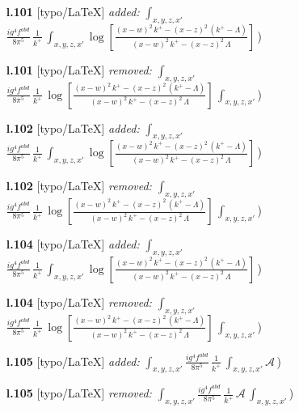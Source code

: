 \documentclass[10pt]{article}
\begin{document}
\begin{itemize}[leftmargin=2.2em,itemsep=1pt,topsep=2pt]
\item[\textbf{l.101}] \textsf{\small [typo/LaTeX]} \emph{added:} $\displaystyle \int_{x,y,z,x'}$$\displaystyle \frac{ig^{4}f^{abd}}{8\pi^{5}}\,\frac{1}{k^{+}}\,\int_{x,y,z,x'}\log{[\frac{(x-w)^{2}\,k^{+}-(x-z)^{2}\,(k^{+}-\Lambda)}{(x-w)^{2}\,k^{+}-(x-z)^{2}\,\Lambda}]}\,${\color{gray}\small)}
\item[\textbf{l.101}] \textsf{\small [typo/LaTeX]} \emph{removed:} $\displaystyle \int_{x,y,z,x'}$$\displaystyle \frac{ig^{4}f^{abd}}{8\pi^{5}}\,\frac{1}{k^{+}}\,\log{[\frac{(x-w)^{2}\,k^{+}-(x-z)^{2}\,(k^{+}-\Lambda)}{(x-w)^{2}\,k^{+}-(x-z)^{2}\,\Lambda}]}\,\int_{x,y,z,x'}${\color{gray}\small)}
\item[\textbf{l.102}] \textsf{\small [typo/LaTeX]} \emph{added:} $\displaystyle \int_{x,y,z,x'}$$\displaystyle \frac{ig^{4}f^{abd}}{8\pi^{5}}\,\frac{1}{k^{+}}\,\int_{x,y,z,x'}\log{[\frac{(x-w)^{2}\,k^{+}-(x-z)^{2}\,(k^{+}-\Lambda)}{(x-w)^{2}\,k^{+}-(x-z)^{2}\,\Lambda}]}\,${\color{gray}\small)}
\item[\textbf{l.102}] \textsf{\small [typo/LaTeX]} \emph{removed:} $\displaystyle \int_{x,y,z,x'}$$\displaystyle \frac{ig^{4}f^{abd}}{8\pi^{5}}\,\frac{1}{k^{+}}\,\log{[\frac{(x-w)^{2}\,k^{+}-(x-z)^{2}\,(k^{+}-\Lambda)}{(x-w)^{2}\,k^{+}-(x-z)^{2}\,\Lambda}]}\,\int_{x,y,z,x'}${\color{gray}\small)}
\item[\textbf{l.104}] \textsf{\small [typo/LaTeX]} \emph{added:} $\displaystyle \int_{x,y,z,x'}$$\displaystyle \frac{ig^{4}f^{abd}}{8\pi^{5}}\,\frac{1}{k^{+}}\,\int_{x,y,z,x'}\log{[\frac{(x-w)^{2}\,k^{+}-(x-z)^{2}\,(k^{+}-\Lambda)}{(x-w)^{2}\,k^{+}-(x-z)^{2}\,\Lambda}]}\,${\color{gray}\small)}
\item[\textbf{l.104}] \textsf{\small [typo/LaTeX]} \emph{removed:} $\displaystyle \int_{x,y,z,x'}$$\displaystyle \frac{ig^{4}f^{abd}}{8\pi^{5}}\,\frac{1}{k^{+}}\,\log{[\frac{(x-w)^{2}\,k^{+}-(x-z)^{2}\,(k^{+}-\Lambda)}{(x-w)^{2}\,k^{+}-(x-z)^{2}\,\Lambda}]}\,\int_{x,y,z,x'}${\color{gray}\small)}
\item[\textbf{l.105}] \textsf{\small [typo/LaTeX]} \emph{added:} $\displaystyle \int_{x,y,z,x'}$$\displaystyle \frac{ig^{4}f^{abd}}{8\pi^{5}}\,\frac{1}{k^{+}}\,\int_{x,y,z,x'}\mathcal{A}\,${\color{gray}\small)}
\item[\textbf{l.105}] \textsf{\small [typo/LaTeX]} \emph{removed:} $\displaystyle \int_{x,y,z,x'}$$\displaystyle \frac{ig^{4}f^{abd}}{8\pi^{5}}\,\frac{1}{k^{+}}\,\mathcal{A}\,\int_{x,y,z,x'}${\color{gray}\small)}

\end{itemize}
\end{document}
